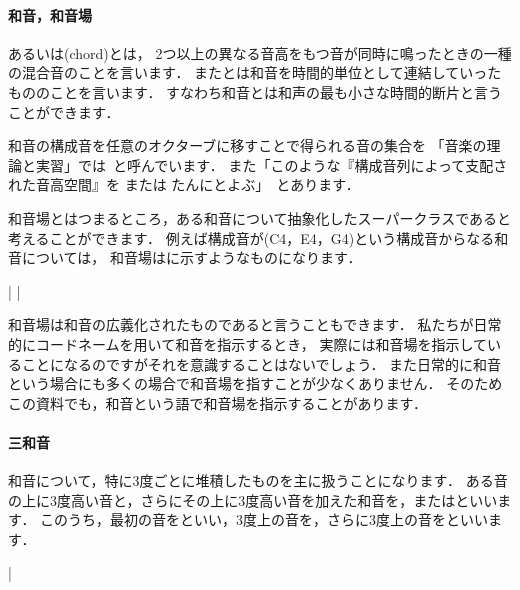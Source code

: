 \documentclass[dvipdfmx,uplatex,b5paper,openany,jbase=12Q,nomag*,textwidth-limit=44%
               ]{gachimuchi}
\begin{document}
\paragraph{和音，和音場}
あるいは\jghost(chord)とは，
2つ以上の異なる音高をもつ音が同時に鳴ったときの一種の混合音のことを言います．
またとは和音を時間的単位として連結していったもののことを言います．
すなわち和音とは和声の最も小さな時間的断片と言うことができます．

和音の構成音を任意のオクターブに移すことで得られる音の集合を
「音楽の理論と実習」では~\cite[p.58]{ctSHIMAOKA1i}と呼んでいます．
また「このような『構成音列によって支配された音高空間』を
または
たんにとよぶ」~\cite[p.59]{ctSHIMAOKA1i}とあります．

和音場とはつまるところ，ある和音について抽象化したスーパークラスであると考えることができます．
例えば構成音が(C4，E4，G4)という構成音からなる和音については，
和音場はに示すようなものになります．

\begin{Music}[.6\linewidth]
  \Startpiece%
  \NOtes\en\def\atnextbar{\znotes|\centerbar{\zw{'c}\zw{'e}\zw{'g}}\en}\bar
  \notes
  |\sk
  \en%
  \endpiece%
\end{Music}

和音場は和音の広義化されたものであると言うこともできます．
私たちが日常的にコードネームを用いて和音を指示するとき，
実際には和音場を指示していることになるのですがそれを意識することはないでしょう．
また日常的に和音という場合にも多くの場合で和音場を指すことが少なくありません．
そのためこの資料でも，和音という語で和音場を指示することがあります．

\paragraph{三和音}
和音について，特に3度ごとに堆積したものを主に扱うことになります．
ある音の上に3度高い音と，さらにその上に3度高い音を加えた和音を，またはといいます．
このうち，最初の音をといい，3度上の音を，さらに3度上の音をといいます．

\begin{Music}[.5\linewidth]
  \nostartrule%
  \Startpiece%
  \Notes%
  \en\bar%
  \Notes%
  \en%
  \endpiece%
\end{Music}
\end{document}
